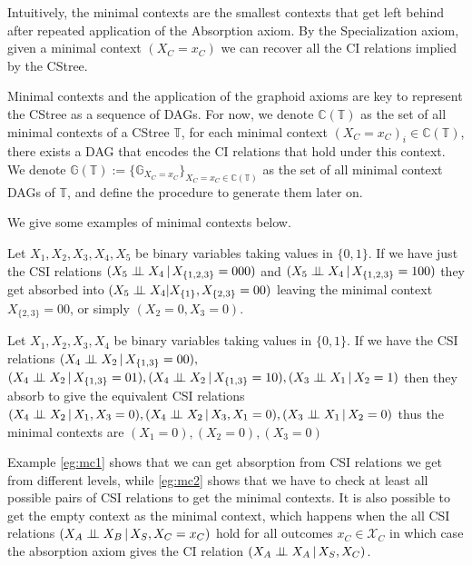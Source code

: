 \documentclass{tufte-book}
\begin{document}
Intuitively, the minimal contexts are the smallest contexts that get left behind after repeated application of the Absorption axiom. By the Specialization axiom, given a minimal context \((X_C=x_C)\) we can recover all the CI relations implied by the CStree.

Minimal contexts and the application of the graphoid axioms are key to represent the CStree as a sequence of DAGs. For now, we denote \(\mathbb{C}(\mathbb{T})\) as the set of all minimal contexts of a CStree \(\mathbb{T}\), for each minimal context \((X_C=x_C)_i \in \mathbb{C}(\mathbb{T})\), there exists a DAG that encodes the CI relations that hold under this context.  We denote \(\mathbb{G}(\mathbb{T}) := \{ \mathbb{G}_{X_C=x_C} \}_{X_C=x_C \in \mathbb{C}(\mathbb{T})}\) as the set of all minimal context DAGs of \(\mathbb{T}\), and define the procedure to generate them later on.


We give some examples of minimal contexts below.

\begin{example}\label{eg:mc1}
Let $X_1,X_2,X_3,X_4,X_5$ be binary variables taking values in $\{0,1\}$. If we have just the CSI relations $(X_5 \perp \!\!\! \perp X_4 \,|\, X_{\{1,2,3\}}=000)$ and $(X_5 \perp \!\!\! \perp X_4 \,|\, X_{\{1,2,3\}}=100)$ they get absorbed into $(X_5 \perp \!\!\! \perp X_4 | X_{\{1\}}, X_{\{2,3\}}=00)$ leaving the minimal context $X_{\{2,3\}}=00$, or simply $(X_2 = 0, X_3=0)$.
\end{example}

\begin{example}\label{eg:mc2}
Let $X_1,X_2,X_3,X_4$ be binary variables taking values in $\{0,1\}$. If we have the  CSI relations $(X_4 \perp \!\!\! \perp X_2 \,|\, X_{\{1,3\}}=00), $\\$ (X_4 \indep X_2 \,|\, X_{\{1,3\}}=01), (X_4 \indep X_2 \,|\, X_{\{1,3\}}=10), (X_3 \indep X_1 \,|\, X_2=1)$ then they absorb to give the equivalent CSI relations $(X_4 \indep X_2 \, |\,X_1, X_3=0), (X_4 \indep X_2 \,|\, X_3, X_1=0), (X_3 \indep X_1 \,|\,X_2=0)$ thus the minimal contexts are $(X_1=0),(X_2=0),(X_3=0)$
\end{example}

Example \ref{eg:mc1} shows that we can get absorption from CSI relations we get from different levels, while \ref{eg:mc2} shows that we have to check at least all possible pairs of CSI relations to get the minimal contexts. It is also possible to get the empty context as the minimal context, which happens when the all CSI relations \((X_A \perp \!\!\! \perp X_B \,|\, X_S, X_C=x_C)\) hold for all outcomes \(x_C \in \mathcal{X}_C\) in which case the absorption axiom gives the CI relation \((X_A \perp \!\!\! \perp X_A\,|\,X_S,X_C)\).
\end{document}
